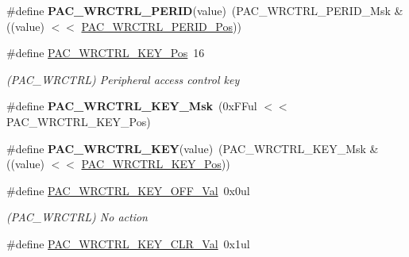 \begin{DoxyCompactItemize}
\item 
\hypertarget{group___s_a_m_l21___p_a_c_ga7349c2df1156e245f28c1dfce60fd282}{}\#define {\bfseries P\+A\+C\+\_\+\+W\+R\+C\+T\+R\+L\+\_\+\+P\+E\+R\+I\+D}(value)~(P\+A\+C\+\_\+\+W\+R\+C\+T\+R\+L\+\_\+\+P\+E\+R\+I\+D\+\_\+\+Msk \& ((value) $<$$<$ \hyperlink{group___s_a_m_l21___p_a_c_ga3dc9ff0a036088acbcfa5f449a5d822e}{P\+A\+C\+\_\+\+W\+R\+C\+T\+R\+L\+\_\+\+P\+E\+R\+I\+D\+\_\+\+Pos}))\label{group___s_a_m_l21___p_a_c_ga7349c2df1156e245f28c1dfce60fd282}

\item 
\hypertarget{group___s_a_m_l21___p_a_c_ga40efb8e0f647731be9f0df54d385282d}{}\#define \hyperlink{group___s_a_m_l21___p_a_c_ga40efb8e0f647731be9f0df54d385282d}{P\+A\+C\+\_\+\+W\+R\+C\+T\+R\+L\+\_\+\+K\+E\+Y\+\_\+\+Pos}~16\label{group___s_a_m_l21___p_a_c_ga40efb8e0f647731be9f0df54d385282d}

\begin{DoxyCompactList}\small\item\em (P\+A\+C\+\_\+\+W\+R\+C\+T\+R\+L) Peripheral access control key \end{DoxyCompactList}\item 
\hypertarget{group___s_a_m_l21___p_a_c_gae6f6c858140e129a3f5d708d546716d7}{}\#define {\bfseries P\+A\+C\+\_\+\+W\+R\+C\+T\+R\+L\+\_\+\+K\+E\+Y\+\_\+\+Msk}~(0x\+F\+Ful $<$$<$ P\+A\+C\+\_\+\+W\+R\+C\+T\+R\+L\+\_\+\+K\+E\+Y\+\_\+\+Pos)\label{group___s_a_m_l21___p_a_c_gae6f6c858140e129a3f5d708d546716d7}

\item 
\hypertarget{group___s_a_m_l21___p_a_c_ga0c4c50842e500cde97bb8f89cd27c216}{}\#define {\bfseries P\+A\+C\+\_\+\+W\+R\+C\+T\+R\+L\+\_\+\+K\+E\+Y}(value)~(P\+A\+C\+\_\+\+W\+R\+C\+T\+R\+L\+\_\+\+K\+E\+Y\+\_\+\+Msk \& ((value) $<$$<$ \hyperlink{group___s_a_m_l21___p_a_c_ga40efb8e0f647731be9f0df54d385282d}{P\+A\+C\+\_\+\+W\+R\+C\+T\+R\+L\+\_\+\+K\+E\+Y\+\_\+\+Pos}))\label{group___s_a_m_l21___p_a_c_ga0c4c50842e500cde97bb8f89cd27c216}

\item 
\hypertarget{group___s_a_m_l21___p_a_c_gaab794b38156768a64abe6a8a232f4322}{}\#define \hyperlink{group___s_a_m_l21___p_a_c_gaab794b38156768a64abe6a8a232f4322}{P\+A\+C\+\_\+\+W\+R\+C\+T\+R\+L\+\_\+\+K\+E\+Y\+\_\+\+O\+F\+F\+\_\+\+Val}~0x0ul\label{group___s_a_m_l21___p_a_c_gaab794b38156768a64abe6a8a232f4322}

\begin{DoxyCompactList}\small\item\em (P\+A\+C\+\_\+\+W\+R\+C\+T\+R\+L) No action \end{DoxyCompactList}\item 
\hypertarget{group___s_a_m_l21___p_a_c_ga5ee6860a242b2e370966db4a8e897d65}{}\#define \hyperlink{group___s_a_m_l21___p_a_c_ga5ee6860a242b2e370966db4a8e897d65}{P\+A\+C\+\_\+\+W\+R\+C\+T\+R\+L\+\_\+\+K\+E\+Y\+\_\+\+C\+L\+R\+\_\+\+Val}~0x1ul\label{group___s_a_m_l21___p_a_c_ga5ee6860a242b2e370966db4a8e897d65}


\end{DoxyCompactItemize}
